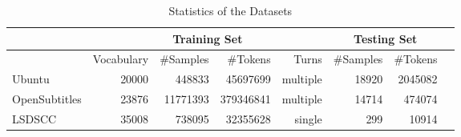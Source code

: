 % 
% 
% 
% 

\begin{table}[H]
    \centering
    \caption{Statistics of the Datasets}
    \label{tab:dataset_stats}
    \begin{tabular}{|l|*{7}{r|}}
        \hline
        & \multicolumn{4}{c|}{Training Set} & \multicolumn{2}{c|}{Testing Set} \\
        \hline
        & Vocabulary & \#Samples & \#Tokens & Turns & \#Samples & \#Tokens \\
        \hline
        Ubuntu & 20000 & 448833 & 45697699 & multiple & 18920 & 2045082   \\
        \hline
        OpenSubtitles & 23876 & 11771393 & 379346841 & multiple & 14714 & 474074 \\
        \hline
        LSDSCC & 35008 & 738095 & 32355628 & single & 299 & 10914 \\
        \hline
    \end{tabular}
\end{table}